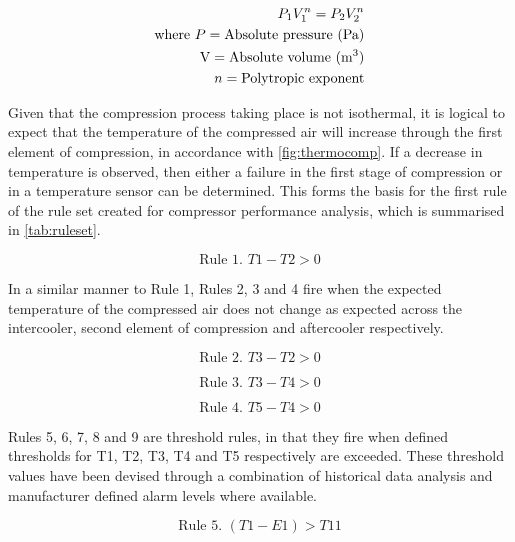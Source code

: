 \begin{eqnarray}
\label{eq:polytropcompression}
P_1 V_1^n = P_2 V_2^n \\
\text{where}~P = \text{Absolute pressure (Pa)} \nonumber \\
\text{V} = \text{Absolute volume (m\textsuperscript{3})} \nonumber \\ 
n = \text{Polytropic exponent} \nonumber
\end{eqnarray} 

Given that the compression process taking place is not isothermal, it is logical to expect that the temperature of the compressed air will increase through the first element of compression, in accordance with \autoref{fig:thermocomp}. If a decrease in temperature is observed, then either a failure in the first stage of compression or in a temperature sensor can be determined. This forms the basis for the first rule of the rule set created for compressor performance analysis, which is summarised in \autoref{tab:ruleset}.

\begin{equation}
\text{Rule 1. } T1 - T2 > 0
\label{eq:rule1}
\end{equation}

In a similar manner to Rule 1, Rules 2, 3 and 4 fire when the expected temperature of the compressed air does not change as expected across the intercooler, second element of compression and aftercooler respectively.

\begin{equation}
\text{Rule 2. } T3 - T2 >0
\label{eq:rule2}
\end{equation}

\begin{equation}
\text{Rule 3. } T3 - T4 >0
\label{eq:rule3}
\end{equation}

\begin{equation}
\text{Rule 4. } T5 - T4 > 0
\label{eq:rule4}
\end{equation}

Rules 5, 6, 7, 8 and 9 are threshold rules, in that they fire when defined thresholds for T1, T2, T3, T4 and T5 respectively are exceeded. These threshold values have been devised through a combination of historical data analysis and manufacturer defined alarm levels where available.

\begin{equation}
\text{Rule 5. } (T1-E1) > T11
\label{eq:rule5}
\end{equation}

